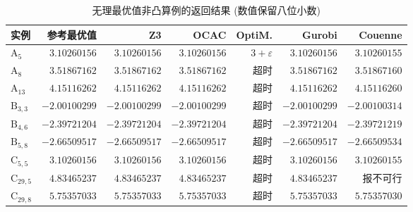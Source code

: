 \begin{table}[H]
\centering
\caption{无理最优值非凸算例的返回结果 (数值保留八位小数)}
\label{tab:exp-nra-irrational}
\footnotesize
\setlength{\tabcolsep}{4pt}
\begin{tabular}{@{}lrrrrrr@{}}
\toprule
实例 & 参考最优值 & Z3 & OCAC & OptiM. & Gurobi & Couenne \\
\midrule
$\mathrm{A}_{5}$ & $3.10260156$ & $3.10260156$ & $3.10260156$ & $3+\varepsilon$ & $3.10260156$ & $3.10260155$ \\
$\mathrm{A}_{8}$ & $3.51867162$ & $3.51867162$ & $3.51867162$ & 超时 & $3.51867162$ & $3.51867160$ \\
$\mathrm{A}_{13}$ & $4.15116262$ & $4.15116262$ & $4.15116262$ & 超时 & $4.15116262$ & $4.15116260$ \\
\midrule
$\mathrm{B}_{3,3}$ & $-2.00100299$ & $-2.00100299$ & $-2.00100299$ & 超时 & $-2.00100299$ & $-2.00100314$ \\
$\mathrm{B}_{4,6}$ & $-2.39721204$ & $-2.39721204$ & $-2.39721204$ & 超时 & $-2.39721204$ & $-2.39721219$ \\
$\mathrm{B}_{5,8}$ & $-2.66509517$ & $-2.66509517$ & $-2.66509517$ & 超时 & $-2.66509517$ & $-2.66509534$ \\
\midrule
$\mathrm{C}_{5,5}$ & $3.10260156$ & $3.10260156$ & $3.10260156$ & 超时 & $3.10260156$ & $3.10260155$ \\
$\mathrm{C}_{29,5}$ & $4.83465237$ & $4.83465237$ & $4.83465237$ & 超时 & $4.83465237$ & 报不可行 \\
$\mathrm{C}_{29,8}$ & $5.75357033$ & $5.75357033$ & $5.75357033$ & 超时 & $5.75357033$ & $5.75357030$ \\
\bottomrule
\end{tabular}
\end{table}

